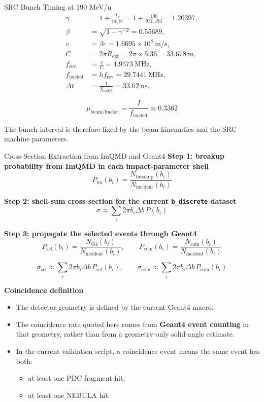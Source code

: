 \documentclass[aspectratio=169]{beamer}
\begin{document}
\begin{frame}{SRC Bunch Timing at 190 MeV/u}
\small
\begin{align*}
\gamma &= 1 + \frac{T_u}{m_u c^2}
       = 1 + \frac{190}{931.494}
       = 1.20397, \\
\beta &= \sqrt{1-\gamma^{-2}}
      = 0.55689, \\
v &= \beta c
  = 1.6695\times 10^8~\mathrm{m/s}, \\
C &= 2\pi R_{\mathrm{ext}}
  = 2\pi \times 5.36
  = 33.678~\mathrm{m}, \\
f_{\mathrm{rev}} &= \frac{v}{C}
                 = 4.9573~\mathrm{MHz}, \\
f_{\mathrm{bucket}} &= h f_{\mathrm{rev}}
                    = 29.7441~\mathrm{MHz}, \\
\Delta t &= \frac{1}{f_{\mathrm{bucket}}}
         = 33.62~\mathrm{ns}.
\end{align*}

\[
\mu_{\mathrm{beam/bucket}} = \frac{I}{f_{\mathrm{bucket}}} \approx 0.3362
\]

\small
The bunch interval is therefore fixed by the beam kinematics and the SRC machine parameters.
\end{frame}

\begin{frame}{Cross-Section Extraction from ImQMD and Geant4}
\tiny
\textbf{Step 1: breakup probability from ImQMD in each impact-parameter shell}
\[
P_{\mathrm{bu}}(b_i)=\frac{N_{\mathrm{breakup}}(b_i)}{N_{\mathrm{incident}}(b_i)}
\]

\textbf{Step 2: shell-sum cross section for the current \texttt{b\_discrete} dataset}
\[
\sigma \approx \sum_i 2\pi b_i \Delta b\, P(b_i)
\]

\textbf{Step 3: propagate the selected events through Geant4}
\[
P_{\mathrm{sel}}(b_i)=\frac{N_{\mathrm{G4}}(b_i)}{N_{\mathrm{incident}}(b_i)},\qquad
P_{\mathrm{coin}}(b_i)=\frac{N_{\mathrm{coin}}(b_i)}{N_{\mathrm{incident}}(b_i)}
\]

\[
\sigma_{\mathrm{sel}} \approx \sum_i 2\pi b_i \Delta b\, P_{\mathrm{sel}}(b_i),\qquad
\sigma_{\mathrm{coin}} \approx \sum_i 2\pi b_i \Delta b\, P_{\mathrm{coin}}(b_i)
\]

\vspace{0.1cm}
\textbf{Coincidence definition}
\begin{itemize}
  \item The detector geometry is defined by the current Geant4 macro.
  \item The coincidence rate quoted here comes from \textbf{Geant4 event counting} in that geometry, rather than from a geometry-only solid-angle estimate.
  \item In the current validation script, a coincidence event means the same event has both:
  \begin{itemize}
    \item at least one PDC fragment hit,
    \item at least one NEBULA hit.
  \end{itemize}
\end{itemize}
\end{frame}
\end{document}
